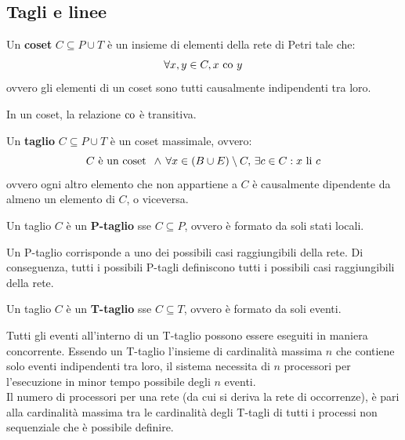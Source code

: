 \subsection*{Tagli e linee}
\begin{defn}
    Un \textbf{coset} $C \subseteq P \cup T$ è un insieme di elementi
    della rete di Petri tale che:
    \[
        \forall x, y \in C, x \textnormal{ co } y
    \]
    ovvero gli elementi di un coset sono tutti causalmente indipendenti tra
    loro.
\end{defn}

\begin{rem}
    In un coset, la relazione $\textnormal{co}$ è transitiva.
\end{rem}

\begin{defn}
    Un \textbf{taglio} $C \subseteq P \cup T$ è un coset massimale, ovvero:
    \[
        C \textnormal{ è un coset } \, \land \, \forall x \in (B \cup E) \setminus C, \,
        \exists c \in C : x \textnormal{ li } c
    \]
    ovvero ogni altro elemento che non appartiene a $C$ è causalmente
    dipendente da almeno un elemento di $C$, o viceversa.
\end{defn}

\begin{defn}
    Un taglio $C$ è un \textbf{P-taglio} sse $C \subseteq P$, ovvero è formato
    da soli stati locali.
\end{defn}

\begin{rem}
    Un P-taglio corrisponde a uno dei possibili casi raggiungibili della rete.
    Di conseguenza, tutti i possibili P-tagli definiscono tutti i possibili
    casi raggiungibili della rete.
\end{rem}

\begin{defn}
    Un taglio $C$ è un \textbf{T-taglio} sse $C \subseteq T$, ovvero è formato
    da soli eventi.
\end{defn}

\begin{rem}
    Tutti gli eventi all'interno di un T-taglio possono essere eseguiti in
    maniera concorrente. Essendo un T-taglio l'insieme di cardinalità massima
    $n$ che contiene solo eventi indipendenti tra loro, il sistema necessita
    di $n$ processori per l'esecuzione in minor tempo possibile degli $n$
    eventi.\\
    Il numero di processori per una rete (da cui si deriva la rete di
    occorrenze), è pari alla cardinalità massima tra le cardinalità degli
    T-tagli di tutti i processi non sequenziale che è possibile definire.
\end{rem}

